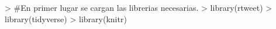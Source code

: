 
\begin{Schunk}
\begin{Sinput}
>   #En primer lugar se cargan las librerias necesarias.
>   library(rtweet)
>   library(tidyverse)
>   library(knitr)
\end{Sinput}
\end{Schunk}




